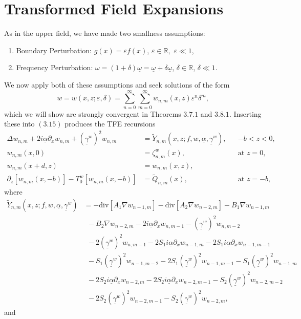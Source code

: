 \section{Transformed Field Expansions}
\label{intro:transformed_field_expansions in lower field}

As in the upper field, we have made two smallness assumptions:
\begin{enumerate}
\item Boundary Perturbation: $g(x) = \varepsilon f(x)$,
  $\varepsilon \in \mathbb R,$ $\varepsilon \ll 1$,
\item Frequency Perturbation: 
  $\omega = (1 + \delta) \underline{\omega} 
  = \underline{\omega} + \delta \underline{\omega}$,
  $\delta \in \mathbb R$, $\delta \ll 1$.
\end{enumerate}
We now apply both of these assumptions and seek solutions of the form
\begin{equation}w=w(x,z;\varepsilon,\delta)=\sum_{n=0}^{\infty}\sum_{m=0}^{\infty}w_{n,m}(x,z)\varepsilon^n\delta^m, \end{equation}
which we will show are strongly convergent in Theorems $3.7.1$ and $3.8.1$. Inserting these into $(3.15)$ produces the TFE recursions
\begin{subequations}
\begin{align}
\Delta w_{n,m} +2i\underline{\alpha}\partial_{x}w_{n,m}+(\underline{\gamma}^w)^2w_{n,m}&=\tilde{Y}_{n,m}\left(x,z;f,w,\underline{\alpha},\underline{\gamma}^w\right), && \text{$-b<z<0$}, \\
w_{n,m}(x,0)&=\zeta^w_{n,m}(x),&& \text{at $z=0$},\\
w_{n,m}(x+d,z)&=w_{n,m}(x,z), \\
\partial_z \left[w_{n,m}(x,-b)\right] - T_0^w[w_{n,m}(x,-b)]&=\tilde{Q}_{n,m}(x),&& \text{at $z=-b$}, 
\end{align}
\end{subequations}
where
\begin{align}
\tilde{Y}_{n,m}\left(x,z;f,w,\underline{\alpha},\underline{\gamma}^w\right)&=-\text{div}[A_1\nabla w_{n-1,m}]-\text{div}[A_2\nabla w_{n-2,m}]-B_1\nabla w_{n-1,m} 
\nonumber\\&~~- B_2\nabla w_{n-2,m}-2i\underline{\alpha}\partial_xw_{n,m-1}-(\underline{\gamma}^w)^2w_{n,m-2}
\nonumber\\&~~-2(\underline{\gamma}^w)^2w_{n,m-1}-2S_1i\underline{\alpha}\partial_xw_{n-1,m}-2S_1i\underline{\alpha}\partial_xw_{n-1,m-1}
\\&~~-S_1(\underline{\gamma}^w)^2w_{n-1,m-2}-2S_1(\underline{\gamma}^w)^2w_{n-1,m-1}-S_1(\underline{\gamma}^w)^2w_{n-1,m}
\nonumber\\&~~-2S_2i\underline{\alpha}\partial_xw_{n-2,m}-2S_2i\underline{\alpha}\partial_xw_{n-2,m-1}-S_2(\underline{\gamma}^w)^2w_{n-2,m-2}
\nonumber\\&~~-2S_2(\underline{\gamma}^w)^2w_{n-2,m-1}-S_2(\underline{\gamma}^w)^2w_{n-2,m},\nonumber
\end{align}
and

